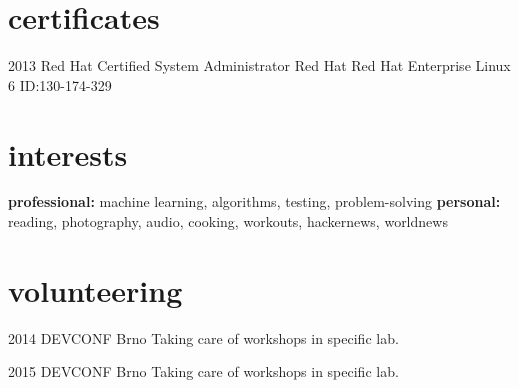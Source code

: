 \documentclass[]{friggeri-cv} %
\begin{document}
\section{certificates}

\begin{entrylist}


\entry
{2013}
{Red Hat Certified System Administrator}
{Red Hat}
{Red Hat Enterprise Linux 6 ID:130-174-329}


\end{entrylist}


\section{interests}

\textbf{professional:} machine learning, algorithms, testing, problem-solving \textbf{personal:} reading, photography, audio, cooking, workouts, hackernews, worldnews


\section{volunteering}

\begin{entrylist}

\entry
{2014}
{DEVCONF}
{Brno}
{Taking care of workshops in specific lab.}

\entry
{2015}
{DEVCONF}
{Brno}
{Taking care of workshops in specific lab.}

\end{entrylist}

\end{document}
